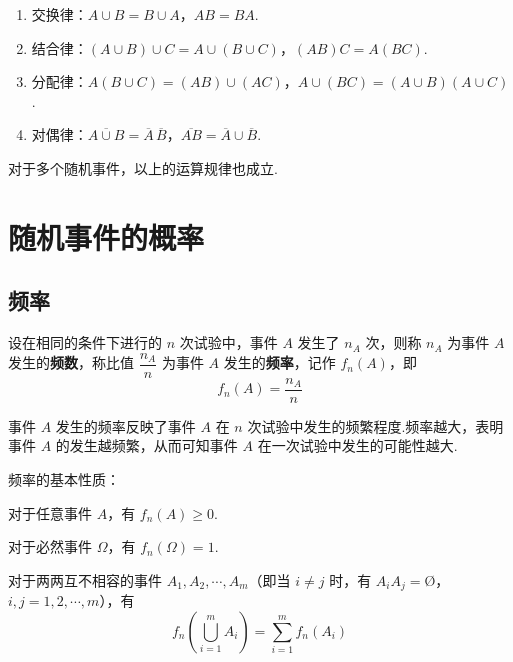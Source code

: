 \begin{enumerate}
    \item 交换律：$A \cup B = B \cup A$，$AB=BA$.
    \item 结合律：$(A \cup B) \cup C = A \cup (B \cup C)$，$(AB)C=A(BC)$.
    \item 分配律：$A(B \cup C)=(AB)\cup(AC)$，$A\cup(BC)=(A \cup B)(A \cup C)$.
    \item 对偶律：$\overline{A \cup B}=\overline{A}\,\overline{B}$，$\overline{AB}=\overline{A}\cup\overline{B}$.
\end{enumerate}

对于多个随机事件，以上的运算规律也成立.

\section{随机事件的概率}

\subsection{频率}

\begin{definition} \label{def:frequence}
    设在相同的条件下进行的 $n$ 次试验中，事件 $A$ 发生了 $n_A$ 次，则称 $n_A$ 为事件 $A$ 发生的\textbf{频数}，称比值 $\dfrac{n_A}{n}$ 为事件 $A$ 发生的\textbf{频率}，记作 $f_n(A)$，即
    $$
    f_n(A)=\dfrac{n_A}{n}
    $$
\end{definition}

事件 $A$ 发生的频率反映了事件 $A$ 在 $n$ 次试验中发生的频繁程度.频率越大，表明事件 $A$ 的发生越频繁，从而可知事件 $A$ 在一次试验中发生的可能性越大.

频率的基本性质：

\setcounter{propertyname}{0}

\begin{property}[(非负性)] \label{prop:frequence:>=0}
    对于任意事件 $A$，有 $f_n(A) \geqslant 0$.
\end{property}

\begin{property}[(规范性)] \label{prop:frequence:1}
    对于必然事件 $\varOmega$，有 $f_n(\varOmega)=1$.
\end{property}

\begin{property}[(有限可加性)] \label{prop:frequence:sum}
    对于两两互不相容的事件 $A_1,A_2,\cdots,A_m$（即当 $i\not=j$ 时，有 $A_i A_j = \text{\O}$，$i,j=1,2,\cdots,m$），有
    $$
    f_n(\bigcup_{i=1}^m A_i) = \sum_{i=1}^m f_n(A_i)
    $$
\end{property}

